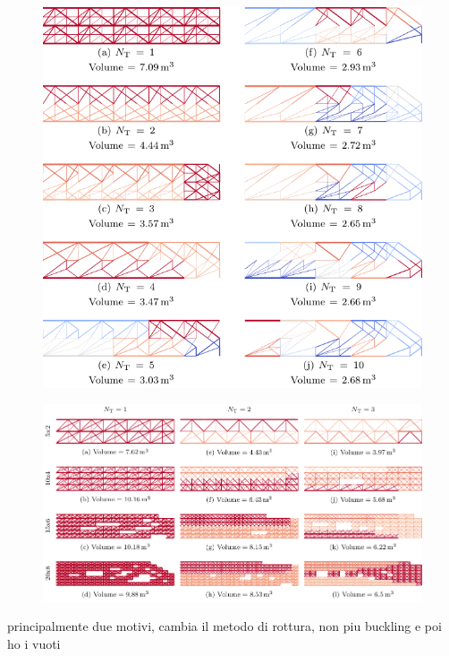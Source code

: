 \begin{figure}
    \centering
    \includegraphics{figures/06_DMO/00_tug_bench_buck/buck.pdf}
    \caption{}
    \label{fig:06}
\end{figure}

\begin{figure}
    \centering
    \includegraphics{figures/06_DMO/00_tug_bench_size/size.pdf}
    \caption{}
    \label{fig:06}
\end{figure}
principalmente due motivi, cambia il metodo di rottura, non piu buckling e poi ho i vuoti

